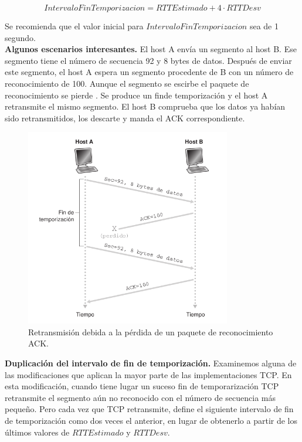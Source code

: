 \documentclass[a4paper,11pt]{article}
\begin{document}
\begin{equation*}
IntervaloFinTemporizacion = RTTEstimado + 4\cdot RTTDesv
\end{equation*}

Se recomienda que el valor inicial para $IntervaloFinTemporizacion$ sea de 1 segundo. \\

\textbf{Algunos escenarios interesantes.} El host A envía un segmento al host B. Ese segmento tiene el número de secuencia 92 y 8 bytes de datos. Después de enviar este segmento, el host A espera un segmento procedente de B con un número de reconocimiento de 100. Aunque el segmento se escirbe el  paquete de reconocimiento se pierde . Se produce un finde temporización y el host A retransmite el mismo segmento. El host B comprueba que los datos ya habían sido retransmitidos, los descarte y manda el ACK correspondiente.

\begin{figure}[h]
\centering
\caption{Retransmisión debida a la pérdida de un paquete de reconocimiento ACK.}
\includegraphics[scale=1,width=0.8\textwidth]{ejemplo_1.png}
\end{figure}

\textbf{Duplicación del intervalo de fin de temporización.} Examinemos alguna de las modificaciones que aplican la mayor parte de las implementaciones TCP. En esta modificación, cuando tiene lugar un suceso fin de temporarización TCP retransmite el segmento aún no reconocido con el número de secuencia más pequeño. Pero cada vez que TCP retransmite, define el siguiente intervalo de fin de temporización como dos veces el anterior, en lugar de obtenerlo a partir de los últimos valores de $RTTEstimado$ y $RTTDesv$. \\
\end{document}
